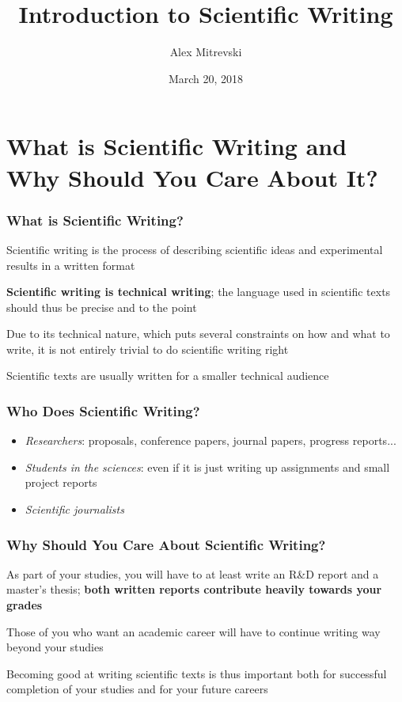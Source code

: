 \documentclass{beamer}
\author[Alex Mitrevski]{Alex Mitrevski}
\title{Introduction to Scientific Writing}
\subtitle{}
\institute[HBRS]{Hochschule Bonn-Rhein-Sieg}
\date{March 20, 2018}
\begin{document}
{
\begin{frame}
\titlepage
\end{frame}
}

%

\section{What is Scientific Writing and Why Should You Care About It?}

\begin{frame}
\frametitle{What is Scientific Writing?}
    Scientific writing is the process of describing scientific ideas and experimental results in a written format
    \newline

    \textbf{Scientific writing is technical writing}; the language used in scientific texts should thus be precise and to the point
    \newline

    Due to its technical nature, which puts several constraints on how and what to write, it is not entirely trivial to do scientific writing right
    \newline

    Scientific texts are usually written for a smaller technical audience
\end{frame}

\begin{frame}
\frametitle{Who Does Scientific Writing?}
    \begin{itemize}
        \item \emph{Researchers}: proposals, conference papers, journal papers, progress reports...
        \item \emph{Students in the sciences}: even if it is just writing up assignments and small project reports
        \item \emph{Scientific journalists}
    \end{itemize}
\end{frame}

\begin{frame}
\frametitle{Why Should You Care About Scientific Writing?}
    \vspace{-1cm}
    As part of your studies, you will have to at least write an R\&D report and a master's thesis; \textbf{both written reports contribute heavily towards your grades}
    \newline

    Those of you who want an academic career will have to continue writing way beyond your studies
    \newline

    Becoming good at writing scientific texts is thus important both for successful completion of your studies and for your future careers
\end{frame}
\end{document}
